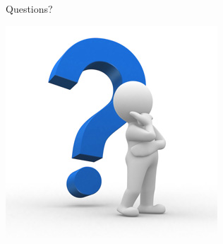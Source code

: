 \begin{frame}[t,fragile]{Questions?}
\begin{center}
\includegraphics[height=.8\textheight,keepaspectratio]{UlbLogos/Questions.jpg}
\end{center}
\end{frame}




